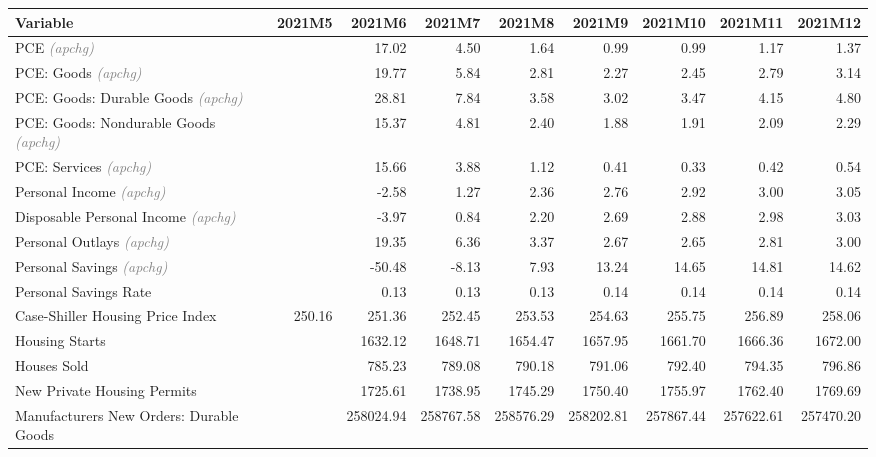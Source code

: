 \documentclass[11pt, letterpaper]{article}\usepackage[]{graphicx}\usepackage[]{color}
\begin{document}
\begin{table}[H]
\centering
\begingroup\fontsize{10pt}{12pt}\selectfont
\begin{tabular}{lrrrrrrrr}
  \hline
Variable & 2021M5 & 2021M6 & 2021M7 & 2021M8 & 2021M9 & 2021M10 & 2021M11 & 2021M12 \\ 
  \hline
PCE \textit{\footnotesize\textcolor{gray}{(apchg)}} &  & 17.02 & 4.50 & 1.64 & 0.99 & 0.99 & 1.17 & 1.37 \\ 
  PCE: Goods \textit{\footnotesize\textcolor{gray}{(apchg)}} &  & 19.77 & 5.84 & 2.81 & 2.27 & 2.45 & 2.79 & 3.14 \\ 
  PCE: Goods: Durable Goods \textit{\footnotesize\textcolor{gray}{(apchg)}} &  & 28.81 & 7.84 & 3.58 & 3.02 & 3.47 & 4.15 & 4.80 \\ 
  PCE: Goods: Nondurable Goods \textit{\footnotesize\textcolor{gray}{(apchg)}} &  & 15.37 & 4.81 & 2.40 & 1.88 & 1.91 & 2.09 & 2.29 \\ 
  PCE: Services \textit{\footnotesize\textcolor{gray}{(apchg)}} &  & 15.66 & 3.88 & 1.12 & 0.41 & 0.33 & 0.42 & 0.54 \\ 
  Personal Income \textit{\footnotesize\textcolor{gray}{(apchg)}} &  & -2.58 & 1.27 & 2.36 & 2.76 & 2.92 & 3.00 & 3.05 \\ 
  Disposable Personal Income \textit{\footnotesize\textcolor{gray}{(apchg)}} &  & -3.97 & 0.84 & 2.20 & 2.69 & 2.88 & 2.98 & 3.03 \\ 
  Personal Outlays \textit{\footnotesize\textcolor{gray}{(apchg)}} &  & 19.35 & 6.36 & 3.37 & 2.67 & 2.65 & 2.81 & 3.00 \\ 
  Personal Savings \textit{\footnotesize\textcolor{gray}{(apchg)}} &  & -50.48 & -8.13 & 7.93 & 13.24 & 14.65 & 14.81 & 14.62 \\ 
  Personal Savings Rate &  & 0.13 & 0.13 & 0.13 & 0.14 & 0.14 & 0.14 & 0.14 \\ 
  Case-Shiller Housing Price Index & 250.16 & 251.36 & 252.45 & 253.53 & 254.63 & 255.75 & 256.89 & 258.06 \\ 
  Housing Starts &  & 1632.12 & 1648.71 & 1654.47 & 1657.95 & 1661.70 & 1666.36 & 1672.00 \\ 
  Houses Sold &  & 785.23 & 789.08 & 790.18 & 791.06 & 792.40 & 794.35 & 796.86 \\ 
  New Private Housing Permits &  & 1725.61 & 1738.95 & 1745.29 & 1750.40 & 1755.97 & 1762.40 & 1769.69 \\ 
  Manufacturers New Orders: Durable Goods &  & 258024.94 & 258767.58 & 258576.29 & 258202.81 & 257867.44 & 257622.61 & 257470.20 \\ 

\end{tabular}
\end{table}
\end{document}
